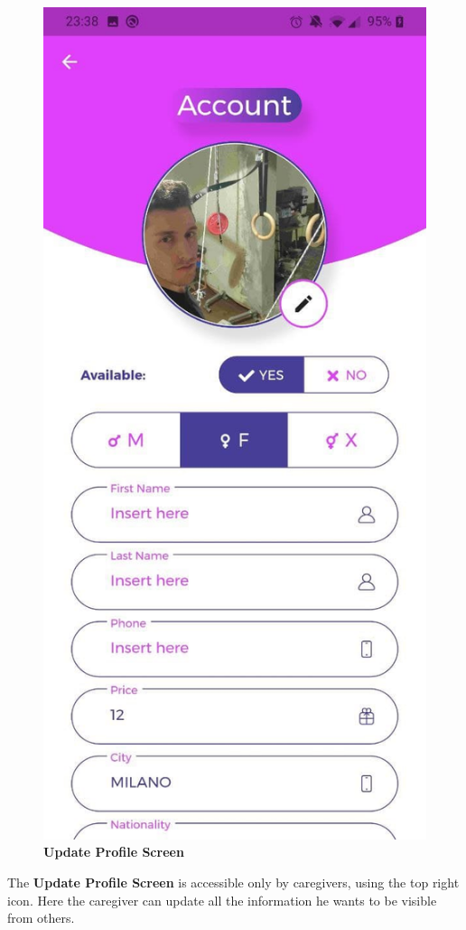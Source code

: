 \documentclass[../../dd.tex]{subfiles}
\begin{document}
    \begin{figure}[H]
        \centering
        \includegraphics[height=.6\textheight]{../../assets/screens/update_profile.jpg}
        \caption{\textbf{Update Profile Screen}}\label{fig:figure}
    \end{figure}
    \begin{center}
        The \textbf{Update Profile Screen} is accessible only by caregivers, using the top right icon.
        Here the caregiver can update all the information he wants to be visible from others.
    \end{center}
\end{document}
